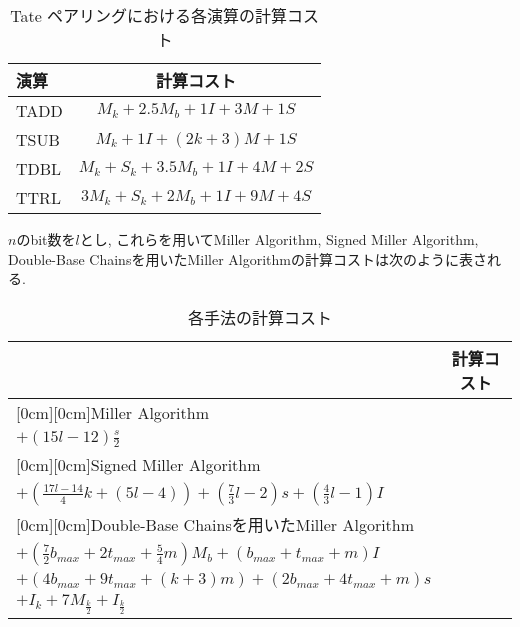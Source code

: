 \begin{table}[htbp]
 \begin{center}
  \begin{tabular}{|l|c|}
  \hline
  演算 & 計算コスト \\
  \hline
  TADD & $M_k + 2.5M_b + 1I + 3M + 1S$ \\
  \hline
  TSUB & $M_k + 1I + (2k + 3)M + 1S$ \\
  \hline
  TDBL & $M_k + S_k + 3.5M_b + 1I + 4M + 2S$ \\
  \hline
  TTRL & $3M_k + S_k + 2M_b + 1I + 9M + 4S$ \\
  \hline
  \end{tabular}
 \end{center}
 \caption{Tate ペアリングにおける各演算の計算コスト}
\end{table}
\par
$n$のbit数を$l$とし, これらを用いてMiller Algorithm, Signed Miller Algorithm, Double-Base Chainsを用いたMiller Algorithmの計算コストは次のように表される. \\
\begin{table}[htbp]
\begin{center}
\begin{tabular}{|l|c|}
\hline
 & 計算コスト\\
\hline
\raisebox{1.5ex}[0cm][0cm]{Miller Algorithm} & \shortstack{$(3l - 2)M_k + (2l - 2)S_k + (\frac{9l - 6}{2}k + 12l - 7) $\\$+ (15l -12)\frac{s}{2}$}\\
\hline
\raisebox{1.5ex}[0cm][0cm]{Signed Miller Algorithm} & \shortstack{$(\frac{4}{3}l + 5)M_k + (l - 1)S_k + I_k + 7M_{\frac{k}{2}} + I_{\frac{k}{2}} $\\$+ (\frac{17l - 14}{4}k + (5l - 4)) + (\frac{7}{3}l - 2)s+ (\frac{4}{3}l - 1)I$}\\
\hline
\raisebox{4.5ex}[0cm][0cm]{Double-Base Chainsを用いたMiller Algorithm} & \shortstack{$(b_{max} + 3t_{max} + m + 6)M_k + (b_{max} + t_{max} + 1)S_k $\\$+ (\frac{7}{2}b_{max} + 2t_{max} + \frac{5}{4} m)M_b + (b_{max} + t_{max} + m)I $\\$+ (4b_{max} + 9t_{max} + (k + 3)m) + (2b_{max} + 4t_{max} + m)s $\\$+ I_k + 7M_{\frac{k}{2}} + I_{\frac{k}{2}}$}\\
\hline
  \end{tabular}
 \end{center}
 \caption{各手法の計算コスト}
\end{table}
